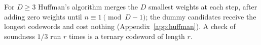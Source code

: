 \begin{remark}
For $D\ge3$ Huffman's algorithm merges the $D$ smallest weights at each step, after adding zero weights until $n\equiv1\pmod{D-1}$; the dummy candidates receive the longest codewords and cost nothing (Appendix~\ref{app:huffman}). A check of soundness $1/3$ run $r$ times is a ternary codeword of length $r$.
\end{remark}
